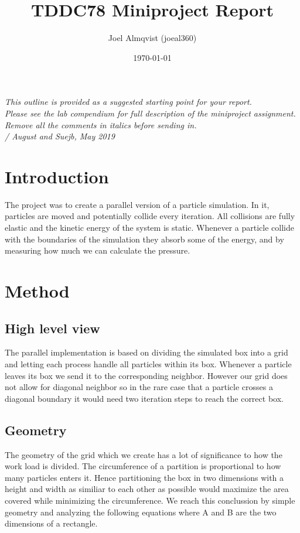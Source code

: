 \documentclass{article}
\title{TDDC78 Miniproject Report}
\author{Joel Almqvist (joeal360)}
\date{\today}
\begin{document}
\maketitle

\emph{This outline is provided as a suggested starting point for your report.
\\ Please see the lab compendium for full description of the miniproject assignment.
\\Remove all the comments in italics before sending in.
\\/ August and Suejb, May 2019}

\section{Introduction}

The project was to create a parallel version of a particle simulation. In it, particles are moved and potentially collide every iteration. All collisions are fully elastic and the kinetic energy of the system is static. Whenever a particle collide with the boundaries of the simulation they absorb some of the energy, and by measuring how much we can calculate the pressure.

\section{Method}

\subsection{High level view}
The parallel implementation is based on dividing the simulated box into a grid and letting each process handle all particles within its box. Whenever a particle leaves its box we send it to the corresponding neighbor. However our grid does not allow for diagonal neighbor so in the rare case that a particle crosses a diagonal boundary it would need two iteration steps to reach the correct box.


\subsection{Geometry}
The geometry of the grid which we create has a lot of significance to how the work load is divided. The circumference of a partition is proportional to how many particles enters it. Hence partitioning the box in two dimensions with a height and width as similiar to each other as possible would maximize the area covered while minimizing the circumference. We reach this conclussion by simple geometry and analyzing the following equations where A and B are the two dimensions of a rectangle.
\end{document}
